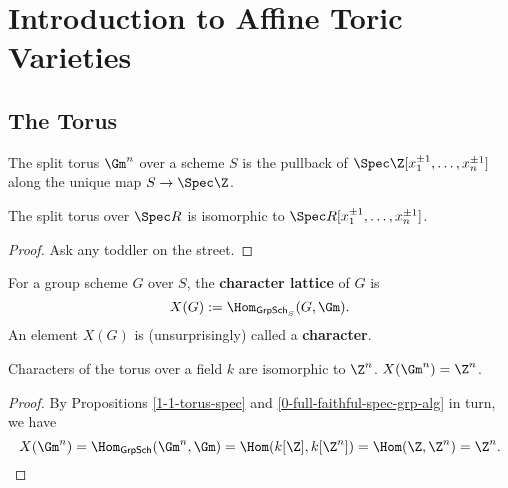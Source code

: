 \section{Introduction to Affine Toric Varieties}


\subsection{The Torus}


\begin{definition}
  \label{1-1-torus}
  \leanok

  The split torus $\Gm^n$ over a scheme $S$ is the pullback of
  $\Spec \Z[x_1^{\pm 1}, \dotsc, x_n^{\pm 1}]$ along the unique map $S \to \Spec \Z$.
\end{definition}


\begin{lemma}
  \label{1-1-torus-spec}
  \leanok

  The split torus over $\Spec R$ is isomorphic to $\Spec R[x_1^{\pm 1}, \dotsc, x_n^{\pm 1}]$.
\end{lemma}
\begin{proof}
  \uses{}

  Ask any toddler on the street.
\end{proof}


\begin{definition}
  \label{1-1-char}
  \leanok

  For a group scheme $G$ over $S$, the {\bf character lattice} of $G$ is
  \[
    X(G) := \Hom_{\mathsf{GrpSch}_S}(G, \Gm).
  \]
  An element $X(G)$ is (unsurprisingly) called a {\bf character}.
\end{definition}

\begin{proposition}
  \label{1-1-char-torus}

  Characters of the torus over a field $k$ are isomorphic to $\Z^n$. $X(\Gm^n) = \Z^n$.
\end{proposition}
\begin{proof}

  By Propositions \ref{1-1-torus-spec} and \ref{0-full-faithful-spec-grp-alg} in turn, we have
  \[
    X(\Gm^n) = \Hom_{\mathsf{GrpSch}}(\Gm^n, \Gm) = \Hom(k[\Z], k[\Z^n]) = \Hom(\Z, \Z^n) = \Z^n.
  \]
\end{proof}


